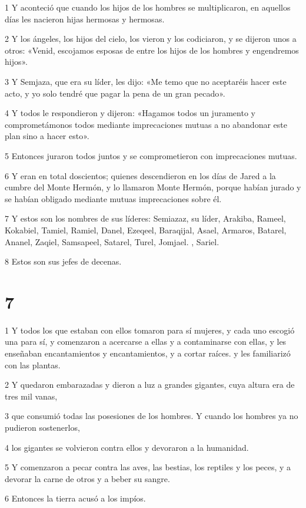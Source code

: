\par 1 Y aconteció que cuando los hijos de los hombres se multiplicaron, en aquellos días les nacieron hijas hermosas y hermosas.
\par 2 Y los ángeles, los hijos del cielo, los vieron y los codiciaron, y se dijeron unos a otros: «Venid, escojamos esposas de entre los hijos de los hombres y engendremos hijos».
\par 3 Y Semjaza, que era su líder, les dijo: «Me temo que no aceptaréis hacer este acto, y yo solo tendré que pagar la pena de un gran pecado».
\par 4 Y todos le respondieron y dijeron: «Hagamos todos un juramento y comprometámonos todos mediante imprecaciones mutuas a no abandonar este plan sino a hacer esto».
\par 5 Entonces juraron todos juntos y se comprometieron con imprecaciones mutuas.
\par 6 Y eran en total doscientos; quienes descendieron en los días de Jared a la cumbre del Monte Hermón, y lo llamaron Monte Hermón, porque habían jurado y se habían obligado mediante mutuas imprecaciones sobre él.
\par 7 Y estos son los nombres de sus líderes: Semiazaz, su líder, Arakiba, Rameel, Kokabiel, Tamiel, Ramiel, Danel, Ezeqeel, Baraqijal, Asael, Armaros, Batarel, Ananel, Zaqiel, Samsapeel, Satarel, Turel, Jomjael. , Sariel.
\par 8 Estos son sus jefes de decenas.

\chapter{7}

\par 1 Y todos los que estaban con ellos tomaron para sí mujeres, y cada uno escogió una para sí, y comenzaron a acercarse a ellas y a contaminarse con ellas, y les enseñaban encantamientos y encantamientos, y a cortar raíces. y les familiarizó con las plantas.
\par 2 Y quedaron embarazadas y dieron a luz a grandes gigantes, cuya altura era de tres mil vanas,
\par 3 que consumió todas las posesiones de los hombres. Y cuando los hombres ya no pudieron sostenerlos,
\par 4 los gigantes se volvieron contra ellos y devoraron a la humanidad.
\par 5 Y comenzaron a pecar contra las aves, las bestias, los reptiles y los peces, y a devorar la carne de otros y a beber su sangre.
\par 6 Entonces la tierra acusó a los impíos.

